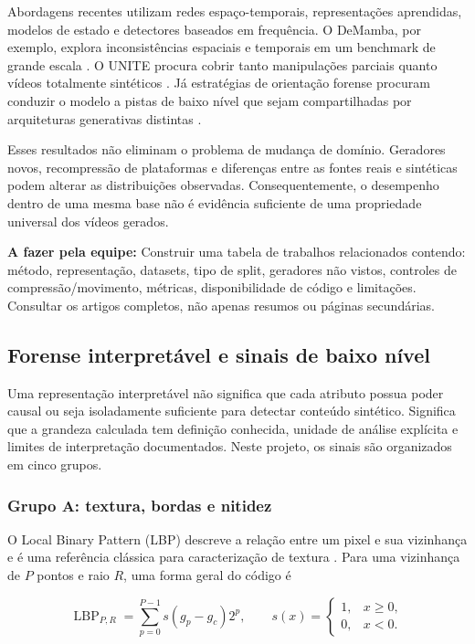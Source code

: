 \documentclass[11pt,a4paper]{article}
\newcommand{\afazer}[1]{%
  \par\smallskip
  \noindent\textcolor{red!70!black}{\textbf{A fazer pela equipe:} #1}
  \par\smallskip
}
\begin{document}
Abordagens recentes utilizam redes espaço-temporais, representações aprendidas,
modelos de estado e detectores baseados em frequência. O DeMamba, por exemplo,
explora inconsistências espaciais e temporais em um benchmark de grande escala
\cite{chen2024demamba}. O UNITE procura cobrir tanto manipulações parciais
quanto vídeos totalmente sintéticos \cite{kundu2025unite}. Já estratégias de
orientação forense procuram conduzir o modelo a pistas de baixo nível que
sejam compartilhadas por arquiteturas generativas distintas
\cite{corvi2025seeing}.

Esses resultados não eliminam o problema de mudança de domínio. Geradores
novos, recompressão de plataformas e diferenças entre as fontes reais e
sintéticas podem alterar as distribuições observadas. Consequentemente, o
desempenho dentro de uma mesma base não é evidência suficiente de uma propriedade
universal dos vídeos gerados.

\afazer{Construir uma tabela de trabalhos relacionados contendo: método,
representação, datasets, tipo de split, geradores não vistos, controles de
compressão/movimento, métricas, disponibilidade de código e limitações. Consultar
os artigos completos, não apenas resumos ou páginas secundárias.}

\subsection{Forense interpretável e sinais de baixo nível}

Uma representação interpretável não significa que cada atributo possua poder
causal ou seja isoladamente suficiente para detectar conteúdo sintético.
Significa que a grandeza calculada tem definição conhecida, unidade de análise
explícita e limites de interpretação documentados. Neste projeto, os sinais são
organizados em cinco grupos.

\subsubsection{Grupo A: textura, bordas e nitidez}

O Local Binary Pattern (LBP) descreve a relação entre um pixel e sua vizinhança
e é uma referência clássica para caracterização de textura
\cite{ojala2002lbp}. Para uma vizinhança de $P$ pontos e raio $R$, uma forma
geral do código é

\begin{equation}
  \operatorname{LBP}_{P,R}
  = \sum_{p=0}^{P-1} s(g_p-g_c)2^p,
  \qquad
  s(x)=
  \begin{cases}
    1, & x\geq 0,\\
    0, & x<0.
  \end{cases}
\end{equation}
\end{document}
